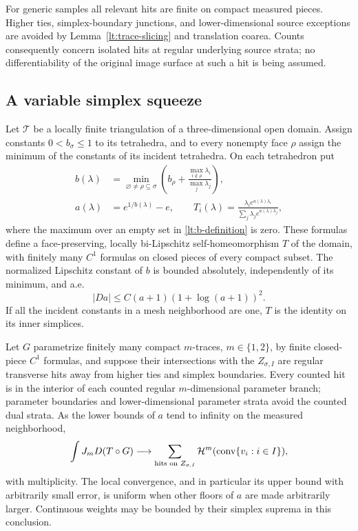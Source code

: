 For generic samples all relevant hits are finite on compact measured
pieces.  Higher ties, simplex-boundary junctions, and lower-dimensional
source exceptions are avoided by Lemma~\ref{lt:trace-slicing} and
translation coarea.  Counts consequently concern isolated hits at
regular underlying source strata; no differentiability of the original
image surface at such a hit is being assumed.

\subsection{A variable simplex squeeze}

\begin{lemma}
\label{lt:squeeze}
Let $\mathcal T$ be a locally finite triangulation of a three-dimensional
open domain.  Assign constants $0<b_\sigma\leq1$ to its tetrahedra,
and to every nonempty face $\rho$ assign the minimum of the constants
of its incident tetrahedra.  On each tetrahedron put
\begin{align}
 b(\lambda)&=
 \min_{\varnothing\ne\rho\subseteq\sigma}
 \left(b_\rho+
        \frac{\max_{i\notin\rho}\lambda_i}{\max_j\lambda_j}\right),
       \label{lt:b-definition}\\
 a(\lambda)&=e^{1/b(\lambda)}-e,
 \qquad
 T_i(\lambda)=
 \frac{\lambda_i e^{a(\lambda)\lambda_i}}
             {\sum_j\lambda_j e^{a(\lambda)\lambda_j}},
       \label{lt:squeeze-definition}
\end{align}
where the maximum over an empty set in \eqref{lt:b-definition} is zero.
These formulas define a face-preserving, locally bi-Lipschitz
self-homeomorphism $T$ of the domain, with finitely many $C^1$ formulas
on closed pieces of every compact subset.  The normalized Lipschitz
constant of $b$ is bounded absolutely, independently of its minimum,
and a.e.
\begin{equation}
 |Da|\leq C(a+1)(1+\log(a+1))^2.
 \label{lt:a-derivative}
\end{equation}
If all the incident constants in a mesh neighborhood are one, $T$ is
the identity on its inner simplices.

Let $G$ parametrize finitely many compact $m$-traces, $m\in\{1,2\}$,
by finite closed-piece $C^1$ formulas, and suppose their intersections
with the $Z_{\sigma,I}$ are regular transverse hits away from higher
ties and simplex boundaries.  Every counted hit is in the interior
of each counted regular $m$-dimensional parameter branch; parameter
boundaries and lower-dimensional parameter strata avoid the counted
dual strata.  As the lower bounds of $a$ tend to
infinity on the measured neighborhood,
\begin{equation}
 \int J_mD(T\circ G)
 \longrightarrow
 \sum_{\text{hits on }Z_{\sigma,I}}
       \mathcal H^m(\operatorname{conv}\{v_i:i\in I\}),
 \label{lt:squeeze-area}
\end{equation}
with multiplicity.  The local convergence, and in particular its upper
bound with arbitrarily small error, is uniform when other floors of
$a$ are made arbitrarily larger.  Continuous weights may be bounded
by their simplex suprema in this conclusion.
\end{lemma}


